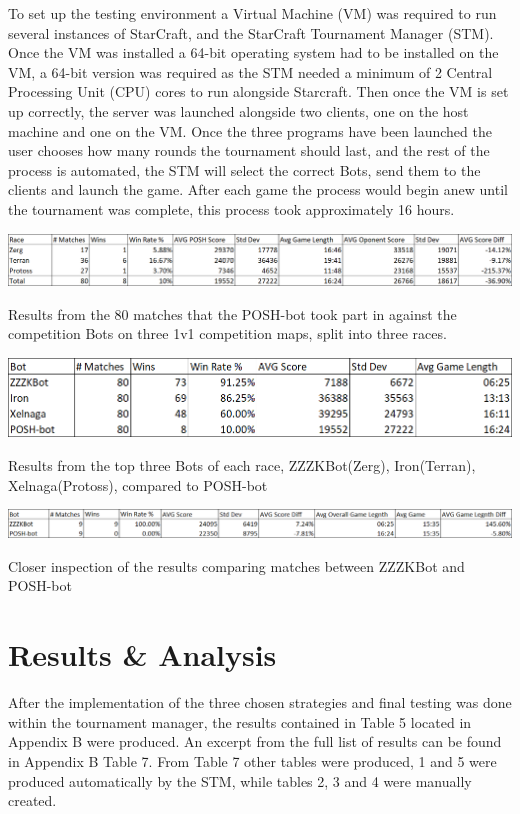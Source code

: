 \documentclass[journal]{IEEEtran}
\begin{document}
	To set up the testing environment a Virtual Machine (VM) was required to run several instances of StarCraft, and the StarCraft Tournament Manager (STM). Once the VM was installed a 64-bit operating system had to be installed on the VM, a 64-bit version was required as the STM needed a minimum of 2 Central Processing Unit (CPU) cores to run alongside Starcraft. Then once the VM is set up correctly, the server was launched alongside two clients, one on the host machine and one on the VM. Once the three programs have been launched the user chooses how many rounds the tournament should last, and the rest of the process is automated, the STM will select the correct Bots, send them to the clients and launch the game. After each game the process would begin anew until the tournament was complete, this process took approximately 16 hours. 
	\begin{table}[]
		\centering
		\includegraphics[width=\textwidth]{POSH-botWin}
		\caption{Results from the 80 matches that the POSH-bot took part in against the competition Bots on three 1v1 competition maps, split into three races.}
		\label{Table3}
		\centering
		\includegraphics[width=\textwidth]{TopThreeWin}
		\caption{Results from the top three Bots of each race, ZZZKBot(Zerg), Iron(Terran), Xelnaga(Protoss), compared to POSH-bot}
		\label{Table4}
		\centering
		\includegraphics[width=\textwidth]{PvsZ}
		\caption{Closer inspection of the results comparing matches between ZZZKBot and POSH-bot}
		\label{Table5}
	\end{table}
	
	\section{Results \& Analysis}
	After the implementation of the three chosen strategies and final testing was done within the tournament manager, the results contained in Table 5 located in Appendix B were produced. An excerpt from the full list of results can be found in Appendix B Table 7. From Table 7 other tables were produced, 1 and 5 were produced automatically by the STM, while tables 2, 3 and 4 were manually created. 
	
\end{document}
